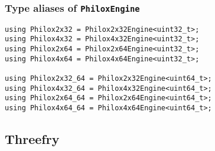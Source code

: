 \subsubsection{Type aliases of \texttt{PhiloxEngine}}

\begin{verbatim}
using Philox2x32 = Philox2x32Engine<uint32_t>;
using Philox4x32 = Philox4x32Engine<uint32_t>;
using Philox2x64 = Philox2x64Engine<uint32_t>;
using Philox4x64 = Philox4x64Engine<uint32_t>;

using Philox2x32_64 = Philox2x32Engine<uint64_t>;
using Philox4x32_64 = Philox4x32Engine<uint64_t>;
using Philox2x64_64 = Philox2x64Engine<uint64_t>;
using Philox4x64_64 = Philox4x64Engine<uint64_t>;
\end{verbatim}

\subsection{Threefry}
\label{sub:Threefry}

